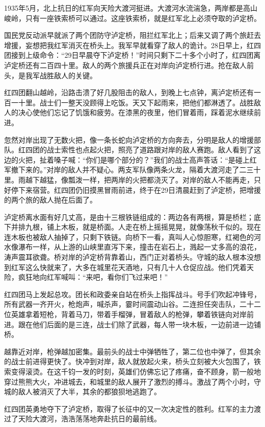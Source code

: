 \documentclass[12pt,UTF-8,openany]{ctexbook}
\begin{document}
\begin{large}
    
    1935年5月，北上抗日的红军向天险大渡河挺进。大渡河水流湍急，两岸都是高山峻岭，只有一座铁索桥可以通过。这座铁索桥，就是红军北上必须夺取的泸定桥。
    
    国民党反动派早就派了两个团防守泸定桥，阻拦红军北上；后来又调了两个旅赶去增援，妄想把我红军消灭在桥头上。我军早就看穿了敌人的诡计。28日早上，红四团接到上级命令：“29日早晨夺下泸定桥！”时间只剩下二十多个小时了，红四团离泸定桥还有二百四十里。敌人的两个旅援兵正在对岸向泸定桥行进。抢在敌人前头，是我军战胜敌人的关键。
    
    红四团翻山越岭，沿路击溃了好几股阻击的敌人，到晚上七点钟，离泸定桥还有一百一十里。战士们一整天没顾得上吃饭。天又下起雨来，把他们都淋透了。战胜敌人的决心使他们忘记了饥饿和疲劳。在漆黑的夜里，他们冒着雨，踩着泥水继续前进。
    
    忽然对岸出现了无数火把，像一条长蛇向泸定桥的方向奔去，分明是敌人的增援部队。红四团的战士索性也点起火把，照亮了道路跟对岸的敌人赛跑。敌人看到了这边的火把，扯着嗓子喊：“你们是哪个部分的？”我们的战士高声答话：“是碰上红军撤下来的。”对岸的敌人并不疑心。两支军队像两条火龙，隔着大渡河走了二三十里。雨越下越猛，像瓢泼一样，把两岸的火把都浇灭了。对岸的敌人不能再走，只好停下来宿营。红四团仍旧摸黑冒雨前进，终于在29日清晨赶到了泸定桥，把增援的两个旅的敌人抛在后面了。
    
    泸定桥离水面有好几丈高，是由十三根铁链组成的：两边各有两根，算是桥栏；底下并排九根，铺上木板，就是桥面。人走在桥上摇摇晃晃，就像荡秋千似的。现在连木板也被敌人抽掉了，只剩下铁链。向桥下一看，真叫人心惊胆寒，红褐色的河水像瀑布一样，从上游的山峡里直泻下来，撞击在岩石上，溅起一丈多高的浪花，涛声震耳欲聋。桥对岸的泸定桥背靠着山，西门正对着桥头。守城的敌人根本没想到红军这么快就来了，大多在城里花天酒地，只有几十人仓促应战。他们凭着天险，疯狂地向红军喊叫：“来吧，看你们飞过来吧！”
    
    红四团马上发起总攻。团长和政委亲自站在桥头上指挥战斗。号手们吹起冲锋号，所有武器一齐开火，枪炮声，喊杀声，霎时间震动山谷。二连担任突击队，二十二位英雄拿着短枪，背着马刀，带着手榴弹，冒着敌人的枪弹，攀着铁链向对岸前进。跟在他们后面的是三连，战士们除了武器，每人带一块木板，一边前进一边铺桥。
    
    越靠近对岸，枪弹越加密集。最前头的战士中弹牺牲了，第二位也中弹了，但其余的战士前进得更快了。快冲到对岸，敌人就放起火来，桥头立刻被大火包围了，铁索变得滚烫。在这千钧一发的时刻，英雄们仿佛忘记了疼痛，奋不顾身，箭一般地穿过熊熊大火，冲进城去，和城里的敌人展开了激烈的搏斗。激战了两个小时，守城的敌人被消灭了大半，其余的都狼狈地逃跑了。
    
    红四团英勇地夺下了泸定桥，取得了长征中的又一次决定性的胜利。红军的主力渡过了天险大渡河，浩浩荡荡地奔赴抗日的最前线。
    
\end{large}
\end{document}
